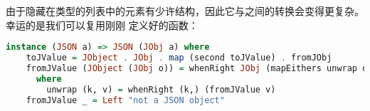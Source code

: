 \documentclass[./main.tex]{subfiles}
\begin{document}
由于隐藏在类型的列表中的元素有少许结构，因此它与之间的转换会变得更复杂。幸运的是我们可以复用刚刚
定义好的函数：

\begin{lstlisting}[language=Haskell]
  instance (JSON a) => JSON (JObj a) where
    toJValue = JObject . JObj . map (second toJValue) . fromJObj
    fromJValue (JObject (JObj o)) = whenRight JObj (mapEithers unwrap o)
      where
        unwrap (k, v) = whenRight (k,) (fromJValue v)
    fromJValue _ = Left "not a JSON object"
\end{lstlisting}
\end{document}
